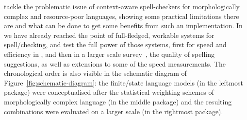\documentclass[officiallayout]{unihelcompling}
\begin{document}
tackle the problematic issue of context-aware spell-checkers for
morphologically complex and resource-poor languages, showing some practical
limitations there are and what can be done to get some benefits from such an
implementation. In  we have
already reached the point of full-fledged, workable systems for
spell\-/checking, and test the full power of those systems, first for speed and
efficiency in , and then in a larger scale
survey~, the quality of spelling suggestions, as
well as extensions to some of the speed measurements.  The chronological order
is also visible in the schematic diagram of Figure~\ref{fig:schematic-diagram}:
the finite\-/state language models (in the leftmost package) were conceptualised
after the statistical weighting schemes of morphologically complex language (in
the middle package) and the resulting combinations were evaluated on a larger
scale (in the rightmost package).
\end{document}
